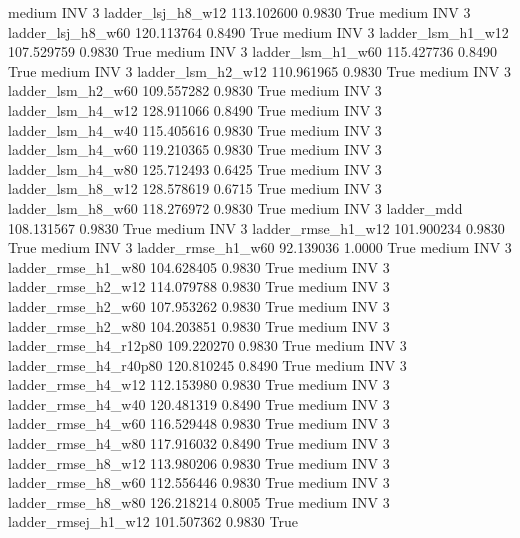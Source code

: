     medium      INV                 3      ladder_lsj_h8_w12 113.102600      0.9830    True
    medium      INV                 3      ladder_lsj_h8_w60 120.113764      0.8490    True
    medium      INV                 3      ladder_lsm_h1_w12 107.529759      0.9830    True
    medium      INV                 3      ladder_lsm_h1_w60 115.427736      0.8490    True
    medium      INV                 3      ladder_lsm_h2_w12 110.961965      0.9830    True
    medium      INV                 3      ladder_lsm_h2_w60 109.557282      0.9830    True
    medium      INV                 3      ladder_lsm_h4_w12 128.911066      0.8490    True
    medium      INV                 3      ladder_lsm_h4_w40 115.405616      0.9830    True
    medium      INV                 3      ladder_lsm_h4_w60 119.210365      0.9830    True
    medium      INV                 3      ladder_lsm_h4_w80 125.712493      0.6425    True
    medium      INV                 3      ladder_lsm_h8_w12 128.578619      0.6715    True
    medium      INV                 3      ladder_lsm_h8_w60 118.276972      0.9830    True
    medium      INV                 3             ladder_mdd 108.131567      0.9830    True
    medium      INV                 3     ladder_rmse_h1_w12 101.900234      0.9830    True
    medium      INV                 3     ladder_rmse_h1_w60  92.139036      1.0000    True
    medium      INV                 3     ladder_rmse_h1_w80 104.628405      0.9830    True
    medium      INV                 3     ladder_rmse_h2_w12 114.079788      0.9830    True
    medium      INV                 3     ladder_rmse_h2_w60 107.953262      0.9830    True
    medium      INV                 3     ladder_rmse_h2_w80 104.203851      0.9830    True
    medium      INV                 3  ladder_rmse_h4_r12p80 109.220270      0.9830    True
    medium      INV                 3  ladder_rmse_h4_r40p80 120.810245      0.8490    True
    medium      INV                 3     ladder_rmse_h4_w12 112.153980      0.9830    True
    medium      INV                 3     ladder_rmse_h4_w40 120.481319      0.8490    True
    medium      INV                 3     ladder_rmse_h4_w60 116.529448      0.9830    True
    medium      INV                 3     ladder_rmse_h4_w80 117.916032      0.8490    True
    medium      INV                 3     ladder_rmse_h8_w12 113.980206      0.9830    True
    medium      INV                 3     ladder_rmse_h8_w60 112.556446      0.9830    True
    medium      INV                 3     ladder_rmse_h8_w80 126.218214      0.8005    True
    medium      INV                 3    ladder_rmsej_h1_w12 101.507362      0.9830    True
